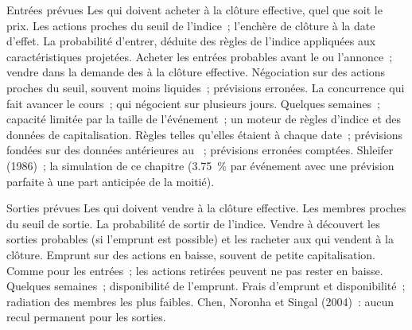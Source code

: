 \begin{strategyfile}{Entrées prévues}\label{strat:s1:index-rebalancing:additions}
 Les  qui doivent acheter à la clôture effective, quel que soit le prix.
 Les actions proches du seuil de l'indice~; l'enchère de clôture à la date d'effet.
 La probabilité d'entrer, déduite des règles de l'indice appliquées aux caractéristiques projetées.
 Acheter les entrées probables avant le  ou l'annonce~; vendre dans la demande des  à la clôture effective.
 Négociation sur des actions proches du seuil, souvent moins liquides~; prévisions erronées.
 La concurrence qui fait avancer le cours~;  qui négocient sur plusieurs jours.
 Quelques semaines~; capacité limitée par la taille de l'événement~; un moteur de règles d'indice et des données de capitalisation.
 Règles telles qu'elles étaient à chaque date~; prévisions fondées sur des données antérieures au ~; prévisions erronées comptées.
 Shleifer (1986)~; la simulation de ce chapitre (3.75~\% par événement avec une prévision parfaite à une part anticipée de la moitié).
\end{strategyfile}

\begin{strategyfile}{Sorties prévues}\label{strat:s1:index-rebalancing:deletions}
 Les  qui doivent vendre à la clôture effective.
 Les membres proches du seuil de sortie.
 La probabilité de sortir de l'indice.
 Vendre à découvert les sorties probables (si l'emprunt est possible) et les racheter aux  qui vendent à la clôture.
 Emprunt sur des actions en baisse, souvent de petite capitalisation.
 Comme pour les entrées~; les actions retirées peuvent ne pas rester en baisse.
 Quelques semaines~; disponibilité de l'emprunt.
 Frais d'emprunt et disponibilité~; radiation des membres les plus faibles.
 Chen, Noronha et Singal (2004)~: aucun recul permanent pour les sorties.
\end{strategyfile}


